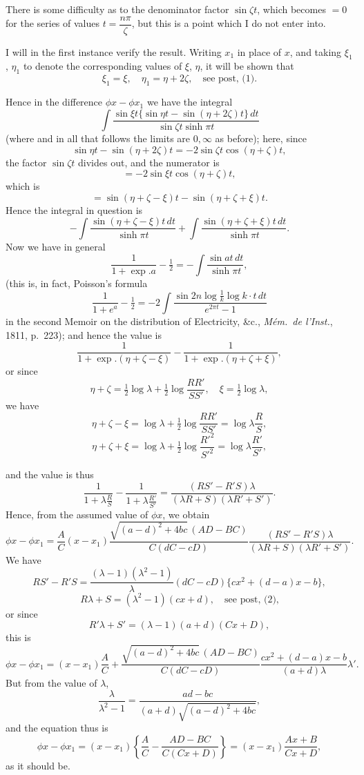 \documentclass[11pt,a4paper]{article}
\begin{document}
There is some difficulty as to the denominator factor $\sin\zeta t$, which becomes $= 0$ for the series of values $t = \dfrac{n\pi}{\zeta}$, but this is a point which I do not enter into.

\medskip

I will in the first instance verify the result. Writing $x_{1}$ in place of $x$, and taking $\xi_{1}$, $\eta_{1}$ to denote the corresponding values of $\xi$, $\eta$, it will be shown that
\[
\xi_{1} = \xi,\quad \eta_{1} = \eta + 2\zeta,\quad \text{see post, (1).}
\]

Hence in the difference $\phi x - \phi x_{1}$ we have the integral
\[
\int\frac{\sin\xi t\{\sin\eta t - \sin(\eta + 2\zeta)t\}\,dt}{\sin\zeta t\sinh\pi t}
\]
(where and in all that follows the limits are $0, \infty$ as before); here, since
\[
\sin\eta t - \sin(\eta + 2\zeta)t = -2\sin\zeta t\cos(\eta + \zeta)t,
\]
the factor $\sin\zeta t$ divides out, and the numerator is
\[
= -2\sin\xi t\cos(\eta + \zeta)t,
\]
which is
\[
= \sin(\eta + \zeta - \xi)t - \sin(\eta + \zeta + \xi)t.
\]
Hence the integral in question is
\[
-\int\frac{\sin(\eta + \zeta - \xi)t\,dt}{\sinh\pi t} + \int\frac{\sin(\eta + \zeta + \xi)t\,dt}{\sinh\pi t}.
\]
Now we have in general
\[
\frac{1}{1 + \exp.a} - \tfrac{1}{2} = -\int\frac{\sin at\,dt}{\sinh\pi t},
\]
(this is, in fact, Poisson's formula
\[
\frac{1}{1 + e^{a}} - \tfrac{1}{2} = -2\int\frac{\sin 2n\log\frac{1}{k}\log k\cdot t\,dt}{e^{2\pi t} - 1}
\]
in the second Memoir on the distribution of Electricity, \&c., \emph{M\'em.\ de l'Inst.}, 1811, p.~223); and hence the value is
\[
\frac{1}{1 + \exp.(\eta + \zeta - \xi)} - \frac{1}{1 + \exp.(\eta + \zeta + \xi)},
\]
or since
\[
\eta + \zeta = \tfrac{1}{2}\log\lambda + \tfrac{1}{2}\log\frac{RR'}{SS'},\quad \xi = \tfrac{1}{2}\log\lambda,
\]
we have
\[
\eta + \zeta - \xi = \log\lambda + \tfrac{1}{2}\log\frac{RR'}{SS'} = \log\lambda\frac{R}{S},
\]
\[
\eta + \zeta + \xi = \log\lambda + \tfrac{1}{2}\log\frac{R'^{2}}{S'^{2}} = \log\lambda\frac{R'}{S'},
\]

\newpage


and the value is thus
\[
\frac{1}{1 + \lambda\frac{R}{S}} - \frac{1}{1 + \lambda\frac{R'}{S'}} = \frac{(RS' - R'S)\lambda}{(\lambda R + S)(\lambda R' + S')}.
\]
Hence, from the assumed value of $\phi x$, we obtain
\[
\phi x - \phi x_{1} = \frac{A}{C}(x - x_{1})\frac{\sqrt{(a - d)^{2} + 4bc}\,(AD - BC)}{C(dC - cD)}\frac{(RS' - R'S)\lambda}{(\lambda R + S)(\lambda R' + S')}.
\]
We have
\[
RS' - R'S = \frac{(\lambda - 1)(\lambda^{2} - 1)}{\lambda}(dC - cD)\{cx^{2} + (d - a)x - b\},
\]
\[
R\lambda + S = (\lambda^{2} - 1)(cx + d),\quad \text{see post, (2),}
\]
or since
\[
R'\lambda + S' = (\lambda - 1)(a + d)(Cx + D),
\]
this is
\[
\phi x - \phi x_{1} = (x - x_{1})\frac{A}{C} + \frac{\sqrt{(a - d)^{2} + 4bc}\,(AD - BC)}{C(dC - cD)}\frac{cx^{2} + (d - a)x - b}{(a + d)\lambda}\lambda'.
\]
But from the value of $\lambda$,
\[
\frac{\lambda}{\lambda^{2} - 1} = \frac{ad - bc}{(a + d)\sqrt{(a - d)^{2} + 4bc}},
\]
and the equation thus is
\[
\phi x - \phi x_{1} = (x - x_{1})\left\{\frac{A}{C} - \frac{AD - BC}{C(Cx + D)}\right\} = (x - x_{1})\frac{Ax + B}{Cx + D},
\]
as it should be.
\end{document}
